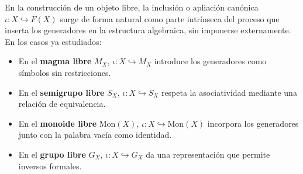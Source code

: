 En la construcción de un objeto libre, la inclusión o apliación canónica \( \iota : X \hookrightarrow F(X) \) surge de forma natural como parte intrínseca del proceso que inserta los generadores en la estructura algebraica, sin imponerse externamente. En los casos ya estudiados:
\begin{itemize}
	\item En el \textbf{magma libre} \( M_X \), \( \iota : X \hookrightarrow M_X \) introduce los generadores como símbolos sin restricciones.
	\item En el \textbf{semigrupo libre} \( S_X \), \( \iota : X \hookrightarrow S_X \) respeta la asociatividad mediante una relación de equivalencia.
	\item En el \textbf{monoide libre} \( \mathrm{Mon}(X) \), \( \iota : X \hookrightarrow \mathrm{Mon}(X) \) incorpora los generadores junto con la palabra vacía como identidad.
	\item En el \textbf{grupo libre} \( G_X \), \( \iota : X \hookrightarrow G_X \) da una representación que permite inversos formales.
\end{itemize} 
